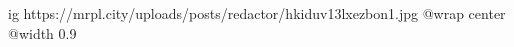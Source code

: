  
 
 
 
 

\ifcmt
  ig https://mrpl.city/uploads/posts/redactor/hkiduv13lxezbon1.jpg
  @wrap center
  @width 0.9
\fi
